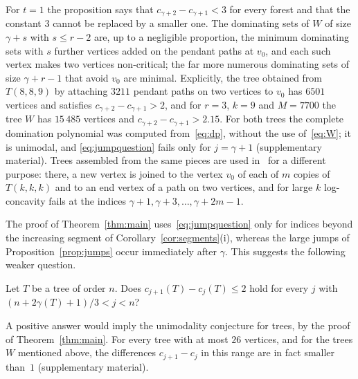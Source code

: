 For $t=1$ the proposition says that $c_{\gamma+2}-c_{\gamma+1}<3$ for every
forest and that the constant $3$ cannot be replaced by a smaller one. The
dominating sets of $W$ of size $\gamma+s$ with $s\le r-2$ are, up to a
negligible proportion, the minimum dominating sets with $s$ further vertices
added on the pendant paths at $v_0$, and each such vertex makes two vertices
non-critical; the far more numerous dominating sets of size $\gamma+r-1$ that
avoid $v_0$ are minimal. Explicitly, the tree obtained from $T(8,8,9)$ by
attaching $3211$ pendant paths on two vertices to $v_0$ has $6501$ vertices
and satisfies $c_{\gamma+2}-c_{\gamma+1}>2$, and for $r=3$, $k=9$ and
$M=7700$ the tree $W$ has $15\,485$ vertices and
$c_{\gamma+2}-c_{\gamma+1}>2.15$. For both trees the complete domination
polynomial was computed from~\eqref{eq:dp}, without the use
of~\eqref{eq:W}; it is unimodal, and \eqref{eq:jumpquestion} fails only for
$j=\gamma+1$ (supplementary material). Trees assembled from the same pieces
are used in~\cite{DHP} for a different purpose: there, a new vertex is joined
to the vertex $v_0$ of each of $m$ copies of $T(k,k,k)$ and to an end vertex
of a path on two vertices, and for large $k$ log-concavity fails at the
indices $\gamma+1,\gamma+3,\dots,\gamma+2m-1$.

The proof of Theorem~\ref{thm:main} uses~\eqref{eq:jumpquestion} only for
indices beyond the increasing segment of Corollary~\ref{cor:segments}(i),
whereas the large jumps of Proposition~\ref{prop:jumps} occur immediately
after $\gamma$. This suggests the following weaker question.

\begin{question}\label{q:jump}
Let $T$ be a tree of order $n$. Does $c_{j+1}(T)-c_j(T)\le2$ hold for every
$j$ with $(n+2\gamma(T)+1)/3<j<n$?
\end{question}

A positive answer would imply the unimodality conjecture for trees, by the
proof of Theorem~\ref{thm:main}. For every tree with at most $26$
vertices, and for the trees $W$ mentioned above, the differences $c_{j+1}-c_j$
in this range are in fact smaller than~$1$ (supplementary material).

